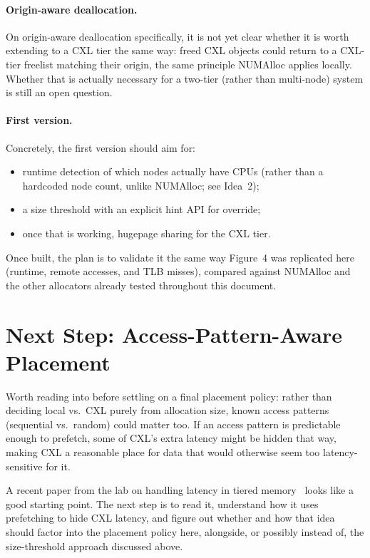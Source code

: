 \documentclass[11pt,a4paper]{article}
\begin{document}
\paragraph{Origin-aware deallocation.}
On origin-aware deallocation specifically, it is not yet clear whether it is worth extending to a CXL tier the same way: freed CXL objects could return to a CXL-tier freelist matching their origin, the same principle NUMAlloc applies locally. Whether that is actually necessary for a two-tier (rather than multi-node) system is still an open question.

\paragraph{First version.}
Concretely, the first version should aim for:
\begin{itemize}[nosep]
  \item runtime detection of which nodes actually have CPUs (rather than a hardcoded node count, unlike NUMAlloc; see Idea~2);
  \item a size threshold with an explicit hint API for override;
  \item once that is working, hugepage sharing for the CXL tier.
\end{itemize}
Once built, the plan is to validate it the same way Figure~4 was replicated here (runtime, remote accesses, and TLB misses), compared against NUMAlloc and the other allocators already tested throughout this document.

\section{Next Step: Access-Pattern-Aware Placement}

Worth reading into before settling on a final placement policy: rather than deciding local vs.\ CXL purely from allocation size, known access patterns (sequential vs.\ random) could matter too. If an access pattern is predictable enough to prefetch, some of CXL's extra latency might be hidden that way, making CXL a reasonable place for data that would otherwise seem too latency-sensitive for it.

A recent paper from the lab on handling latency in tiered memory~\cite{tolerate} looks like a good starting point. The next step is to read it, understand how it uses prefetching to hide CXL latency, and figure out whether and how that idea should factor into the placement policy here, alongside, or possibly instead of, the size-threshold approach discussed above.
\end{document}

